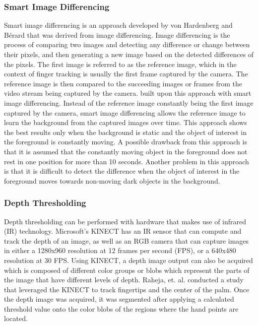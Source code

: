 \documentclass{acm_proc_article-sp}
\begin{document}
\subsubsection{Smart Image Differencing}
Smart image differencing is an approach developed by von Hardenberg and B\'erard \cite{Hardenberg:2001} that was derived from image differencing. Image differencing is the process of comparing two images and detecting any difference or change between their pixels, and then generating a new image based on the detected differences of the pixels. The first image is referred to as the reference image, which in the context of finger tracking is usually the first frame captured by the camera. The reference image is then compared to the succeeding images or frames from the video stream being captured by the camera.
\cite{Hardenberg:2001} built upon this approach with smart image differencing. Instead of the reference image constantly being the first image captured by the camera, smart image differencing allows the reference
image to learn the background from the captured images over time. This approach shows the best results only when the background is static and the object of interest in the foreground is constantly moving. A possible drawback from this approach is that it is assumed that the constantly moving object in the foreground does not rest in one position for more than 10 seconds. Another problem in this approach is that it is difficult to detect the difference when the object of interest in the foreground moves towards non-moving dark objects in the background.

\subsubsection{Depth Thresholding}
Depth thresholding can be performed with hardware that makes use of infrared (IR) technology. Microsoft's KINECT has an IR sensor that can compute and track the depth of an image, as well as an RGB camera that can capture images in either a 1280x960 resolution at 12 frames per second (FPS), or a 640x480 resolution at
30 FPS. Using KINECT, a depth image output can also be acquired which is composed of different color groups or blobs which represent the parts of the image that have different levels of depth. Raheja, et. al. \cite{Raheja:2011} conducted a study that leveraged the KINECT to track fingertips and the center of the palm. Once the depth image was acquired, it was segmented after applying a calculated threshold value onto the color blobs of the regions where the hand points are located.
\end{document}
